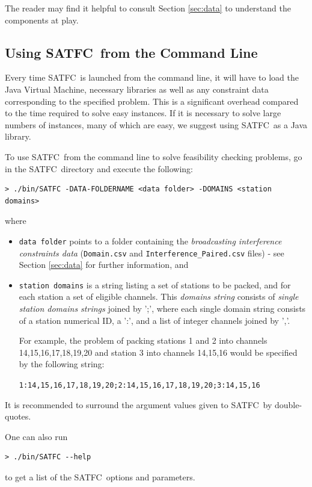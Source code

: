 \documentclass[
10pt, %
letterpaper, %
oneside, %
headinclude,footinclude, %
BCOR5mm, %
needspace, %
]{scrartcl}
\newcommand{\SATFC}{\textsc{SATFC}~}
\begin{document}
The reader may find it helpful to consult Section \ref{sec:data} to understand the components at play.

\subsection{Using \SATFC from the Command Line}\label{sec:standalone}

\begin{fwarning}
Every time \SATFC is launched from the command line, it will have to load the Java Virtual Machine, necessary libraries as well as any constraint data corresponding to the specified problem. This is a significant overhead compared to the time required to solve easy instances. If it is necessary to solve large numbers of instances, many of which are easy, we suggest using \SATFC as a Java library.
\end{fwarning}

To use \SATFC from the command line to solve feasibility checking problems, go in the \SATFC directory and execute the following:
\begin{lstlisting}[style=Bash]
> ./bin/SATFC -DATA-FOLDERNAME <data folder> -DOMAINS <station domains>
\end{lstlisting}
where 
\begin{itemize}
\item \texttt{data folder} points to a folder containing the \emph{broadcasting interference constraints data} (\texttt{Domain.csv} and \texttt{Interference\_Paired.csv} files) - see Section \ref{sec:data} for further information, and
\item \texttt{station domains} is a string listing a set of stations to be packed, and for each station a set of eligible channels. This \emph{domains string} consists of \emph{single station domains strings} joined by ';', where each single domain string consists of a station numerical ID, a ':', and a list of integer channels joined by ','. 

For example, the problem of packing stations 1 and 2 into channels 14,15,16,17,18,19,20 and station 3 into channels 14,15,16 would be specified by the following string:
\begin{center}
\texttt{1:14,15,16,17,18,19,20;2:14,15,16,17,18,19,20;3:14,15,16}
\end{center}
\end{itemize}
It is recommended to surround the argument values given to \SATFC by double-quotes.

One can also run
\begin{lstlisting}[style=Bash]
> ./bin/SATFC --help
\end{lstlisting}
to get a list of the \SATFC options and parameters.
\end{document}
